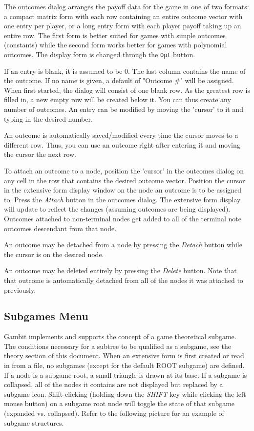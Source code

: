 The outcomes dialog arranges the payoff data for the game in one of two
formats: a compact matrix form with each row containing an entire outcome 
vector with one entry per player, or a long entry form with each player
payoff taking up an entire row.  The first form is better suited for games
with simple outcomes (constants) while the second form works better for games
with polynomial outcomes.  The display form is changed through the {\tt Opt}
 button.

If an entry is blank, it is assumed to be 0.  The last column
contains the name of the outcome.  If no name is given, a default of
"Outcome \#" will be assigned.  When first started, the dialog will consist
of one blank row.  As the greatest row is filled in, a new empty row will
be created below it.  You can thus create any number of outcomes.  An
entry can be modified by moving the 'cursor' to it and typing in the
desired number.

An outcome is automatically saved/modified every time the cursor moves to
a different row.  Thus, you can use an outcome right after entering it and
moving the cursor the next row.

To attach an outcome to a node, position the 'cursor' in the outcomes
dialog on any cell in the row that contains the desired outcome vector.
Position the cursor in the extensive form display window on the node an
outcome is to be assigned to.  Press the {\em Attach} button in the
outcomes dialog.  The extensive form display will update to reflect the
changes (assuming outcomes are being displayed).  Outcomes attached to
non-terminal nodes get added to all of the terminal note outcomes descendant
from that node.

An outcome may be detached from a node by pressing the {\em Detach} button
while the cursor is on the desired node.  

An outcome may be deleted entirely by pressing the {\em Delete} button.  Note
that that outcome is automatically detached from all of the nodes it was
attached to previously.


\subsection{Subgames Menu}\label{SubgamesMenu}
Gambit implements and supports the concept of a game theoretical
subgame. The 
conditions necessary for a subtree to be qualified as a subgame, see
the 
theory section of this document.  When an extensive form is first
created or 
read in from a file, no subgames (except for the default ROOT subgame) are 
defined.  If a node is a subgame root, a small triangle is drawn at
its base. 
If a subgame is collapsed, all of the nodes it contains are not displayed but 
replaced by a subgame icon.  Shift-clicking
(holding down the {\em SHIFT} key while clicking the left mouse button) on a
subgame root node will toggle the state of that subgame (expanded vs. collapsed).
Refer to the following picture for an example of subgame structures. 



